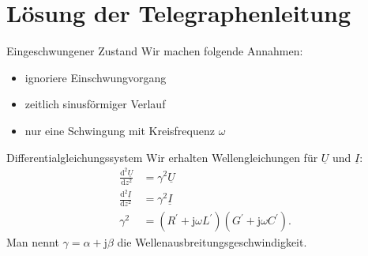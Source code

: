 \documentclass{beamer}
\begin{document}
\section{Lösung der Telegraphenleitung}


\begin{frame}{Eingeschwungener Zustand}
Wir machen folgende Annahmen:
\begin{itemize}
    \item<1-> ignoriere Einschwungvorgang
    \item<2-> zeitlich sinusförmiger Verlauf
    \item<3-> nur eine Schwingung mit Kreisfrequenz $\omega$
\end{itemize}

\vspace*{1em}

\end{frame}


\begin{frame}{Differentialgleichungssystem}
Wir erhalten Wellengleichungen für $\underline{U}$ und $\underline{I}$:
\begin{align}
    \frac{\text{d}^{2} \underline{U}}{\text{d} z^{2}} &= \gamma^{2} \underline{U} \label{eq:VerlustDgl1} \\[1ex]
    \frac{\text{d}^{2} \underline{I}}{\text{d} z^{2}} &= \gamma^{2} \underline{I} \label{eq:VerlustDgl2} \\[1ex]
    \gamma^{2} &= \left( R^{\prime} + \mathrm{j} \omega L^{\prime} \right) \left( G^{\prime} + \mathrm{j} \omega
    C^{\prime} \right) \label{eq:Gamma}.
\end{align}
Man nennt $\gamma = \alpha + \mathrm{j} \beta$ die Wellenausbreitungsgeschwindigkeit.

\end{frame}
\end{document}
